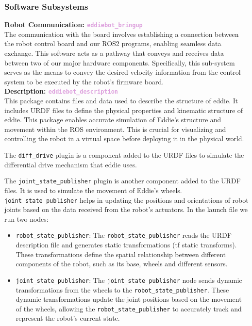 \subsubsection{Software Subsystems}
\textbf{Robot Communication: \textcolor{Plum}{\texttt{\Large eddiebot\_bringup}}}\\
The communication with the board involves establishing a connection between the robot control board and our ROS2 programs, enabling seamless data exchange. This software acts as a  pathway that conveys and receives data between two of our major hardware components. Specifically, this sub-system serves as the means to convey the desired velocity information from the control system to be executed by the robot's firmware board. \\

\textbf{Description: \textcolor{Plum}{\texttt{\Large eddiebot\_description}}}\\
This package contains files and data used to describe the structure of eddie. It includes URDF files to define the physical properties and kinematic structure of eddie. This package enables accurate simulation of Eddie's structure and movement within the ROS environment. This is crucial for visualizing and controlling the robot in a virtual space before deploying it in the physical world.

The \texttt{diff\_drive} plugin is a component added to the URDF files to simulate the differential drive mechanism that eddie uses.

The \texttt{joint\_state\_publisher} plugin is another component added to the URDF files. It is used to simulate the movement of Eddie's wheels. \texttt{joint\_state\_publisher} helps in updating the positions and orientations of robot joints based on the data received from the robot's actuators.
In the launch file we run two nodes:
\begin{itemize}
    \item \texttt{robot\_state\_publisher}: The \texttt{robot\_state\_publisher} reads the URDF description file and generates static transformations (tf static transforms). These transformations define the spatial relationship between different components of the robot, such as its base, wheels and different sensors.
    \item \texttt{joint\_state\_publisher}: The \texttt{joint\_state\_publisher} node sends dynamic transformations from the wheels to the \texttt{robot\_state\_publisher}. These dynamic transformations update the joint positions based on the movement of the wheels, allowing the \texttt{robot\_state\_publisher} to accurately track and represent the robot's current state.\\
\end{itemize}

